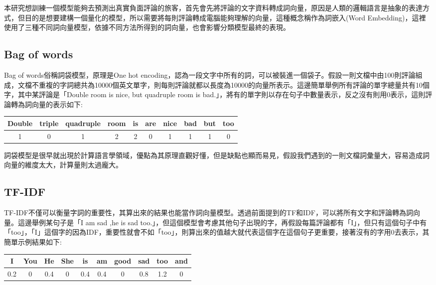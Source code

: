 	本研究想訓練一個模型能夠去預測出真實負面評論的旅客，首先會先將評論的文字資料轉成詞向量，原因是人類的邏輯語言是抽象的表達方式，但目的是想要建構一個量化的模型，所以需要將每則評論轉成電腦能夠理解的向量，這種概念稱作為詞嵌入(Word Embedding)，這裡使用了三種不同詞向量模型，依據不同方法所得到的詞向量，也會影響分類模型最終的表現。\\

\subsection{Bag of words}
	
	Bag of words俗稱詞袋模型，原理是One hot encoding，認為一段文字中所有的詞，可以被裝進一個袋子。假設一則文檔中由100則評論組成，文檔不重複的字詞總共為10000個英文單字，則每則評論就都以長度為10000的向量所表示。這邊簡單舉例所有評論的單字總量共有10個字，其中某評論是「Double room is nice, but quadruple room is bad.」，將有的單字則以存在句子中數量表示，反之沒有則用0表示，這則評論轉為詞向量的表示如下:
	
	\begin{table}[h]
	\centering
	\begin{tabular}{cccccccccc}
	\toprule
	Double & triple & quadruple & room & is & are & nice & bad & but & too\\
	\midrule
	1 & 0 & 1 & 2 & 2 & 0 & 1 & 1 & 1 & 0 \\
	\bottomrule
	\end{tabular}
	\end{table}
	
	
	詞袋模型是很早就出現於計算語言學領域，優點為其原理直觀好懂，但是缺點也顯而易見，假設我們遇到的一則文檔詞彙量大，容易造成詞向量的維度太大，計算量則太過龐大。
	
\newpage

\subsection{TF-IDF}
	
	TF-IDF不僅可以衡量字詞的重要性，其算出來的結果也能當作詞向量模型。透過前面提到的TF和IDF，可以將所有文字和評論轉為詞向量。這邊舉例某句子是「I am sad ,he is sad too.」，但這個模型會考慮其他句子出現的字，再假設每篇評論都有「I」，但只有這個句子中有「too」，「I」這個字的因為IDF，重要性就會不如「too」，則算出來的值越大就代表這個字在這個句子更重要，接著沒有的字用0去表示，其簡單示例結果如下:
	
	\begin{table}[h]
	\centering
	\begin{tabular}{cccccccccc}
	\toprule
	I & You & He & She & is & am & good & sad & too & and\\
	\midrule
	0.2 & 0 & 0.4 & 0 & 0.4 & 0.4 & 0 & 0.8 & 1.2 & 0 \\
	\bottomrule
	\end{tabular}
	\end{table}
	
